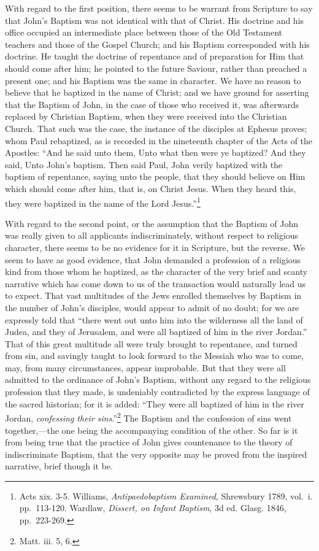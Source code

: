 \documentclass[english,]{book}
\begin{document}
With regard to the first position, there seems to be warrant from Scripture to say that John's Baptism was not identical with that of Christ. His doctrine and his office occupied an intermediate place between those of the Old Testament teachers and those of the Gospel Church; and his Baptism corresponded with his doctrine. He taught the doctrine of repentance and of preparation for Him that should come after him; he pointed to the future Saviour, rather than preached a present one; and his Baptism was the same in character. We have no reason to believe that he baptized in the name of Christ; and we have ground for asserting that the Baptism of John, in the case of those who received it, was afterwards replaced by Christian Baptism, when they were received into the Christian Church. That such was the case, the instance of the disciples at Ephesus proves; whom Paul rebaptized, as is recorded in the nineteenth chapter of the Acts of the Apostles: ``And he said unto them, Unto what then were ye baptized? And they said, Unto John's baptism. Then said Paul, John verily baptized with the baptism of repentance, saying unto the people, that they should believe on Him which should come after him, that is, on Christ Jesus. When they heard this, they were baptized in the name of the Lord Jesus.''\footnote{Acts xix. 3-5. Williams, \emph{Antipaedobaptism Examined}, Shrewsbury 1789, vol.~i. pp.~113-120. Wardlaw, \emph{Dissert, on Infant Baptism}, 3d ed. Glasg. 1846, pp.~223-269.}

With regard to the second point, or the assumption that the Baptism of John was really given to all applicants indiscriminately, without respect to religious character, there seems to be no evidence for it in Scripture, but the reverse. We seem to have as good evidence, that John demanded a profession of a religious kind from those whom he baptized, as the character of the very brief and scanty narrative which has come down to us of the transaction would naturally lead us to expect. That vast multitudes of the Jews enrolled themselves by Baptism in the number of John's disciples, would appear to admit of no doubt; for we are expressly told that ``there went out unto him into the wilderness all the land of Judea, and they of Jerusalem, and were all baptized of him in the river Jordan.'' That of this great multitude all were truly brought to repentance, and turned from sin, and savingly taught to look forward to the Messiah who was to come, may, from many circumstances, appear improbable. But that they were all admitted to the ordinance of John's Baptism, without any regard to the religious profession that they made, is undeniably contradicted by the express language of the sacred historian; for it is added: ``They were all baptized of him in the river Jordan, \emph{confessing their sins}.''\footnote{Matt. iii. 5, 6.} The Baptism and the confession of sins went together,---the one being the accompanying condition of the other. So far is it from being true that the practice of John gives countenance to the theory of indiscriminate Baptism, that the very opposite may be proved from the inspired narrative, brief though it be.
\end{document}

